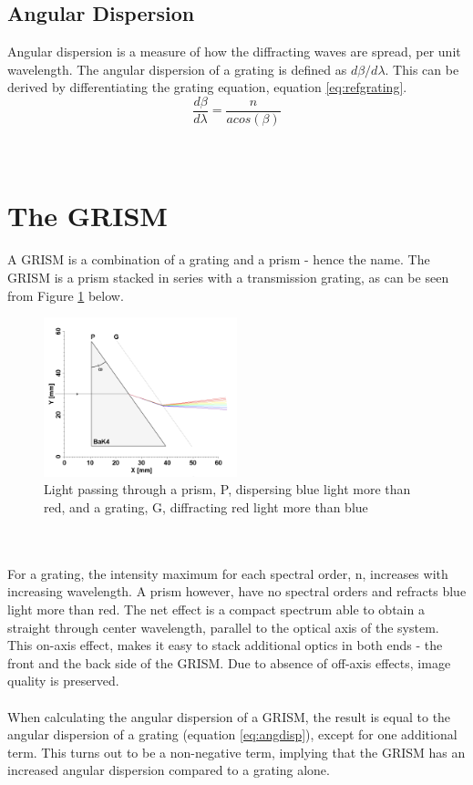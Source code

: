 \subsection{Angular Dispersion}
Angular dispersion is a measure of how the diffracting waves are spread, per unit wavelength. The angular dispersion of a grating is defined as $d\beta/d\lambda$. This can be derived by differentiating the grating equation, equation \ref{eq:refgrating}. 
\begin{equation}
    \frac{d\beta}{d\lambda} = \frac{n}{a cos(\beta)}
    \label{eq:angdisp}
\end{equation}
\\\\
\vspace{1.3cm}

\section{The GRISM}
A GRISM is a combination of a grating and a prism - hence the name. The GRISM is a prism stacked in series with a transmission grating, as can be seen from Figure \ref{fig:grism} below.
\begin{figure}[H]
    \centering
    \includegraphics[width=0.5\textwidth]{Images/theory/GRISM.png}
    \caption{Light passing through a prism, P, dispersing blue light more than red, and a grating, G, diffracting red light more than blue}
    \label{fig:grism}
\end{figure}
\\\\
For a grating, the intensity maximum for each spectral order, n, increases with increasing wavelength. A prism however, have no spectral orders and refracts blue light more than red. The net effect is a compact spectrum able to obtain a straight through center wavelength, parallel to the optical axis of the system. This on-axis effect, makes it easy to stack additional optics in both ends - the front and the back side of the GRISM. Due to absence of off-axis effects, image quality is preserved.
\\\\
When calculating the angular dispersion of a GRISM, the result is equal to the angular dispersion of a grating (equation \ref{eq:angdisp}), except for one additional term. This turns out to be a non-negative term, implying that the GRISM has an increased angular dispersion compared to a grating alone.


